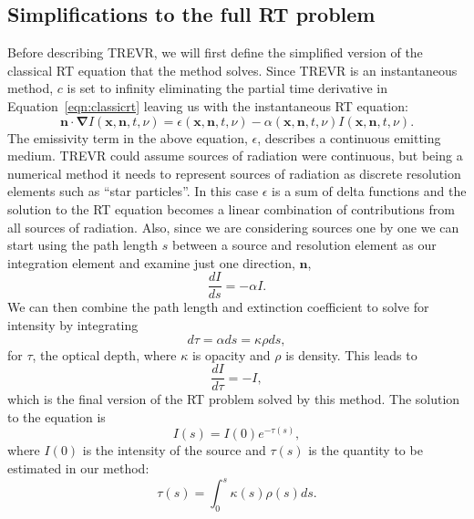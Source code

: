 \documentclass[fleq,usenatbib]{mnras}
\newcommand{\acro}{TREVR}
\begin{document}
{\subsection{Simplifications to the full RT problem}\label{sec:rteq}
Before describing \acro{}, we will first define the simplified version of the 
classical RT equation that the method solves. Since \acro{} is an instantaneous 
method, $c$ is set to infinity eliminating the partial time derivative in 
Equation~\ref{eqn:classicrt} leaving us with the instantaneous RT equation:
\begin{equation} \label{infcrt}
\mathbf{n \cdot \nabla} I\left(\mathbf{x}, \mathbf{n}, t, 
\nu\right) = \epsilon\left(\mathbf{x}, \mathbf{n}, t, \nu\right) - 
\alpha\left(\mathbf{x}, \mathbf{n}, t, \nu\right) 
I\left(\mathbf{x}, \mathbf{n}, t, \nu\right).
\end{equation}
The emissivity term in the above equation, $\epsilon$, describes a continuous 
emitting medium. \acro{} could assume sources of radiation were continuous, but 
being a numerical method it needs to represent sources of radiation as 
discrete resolution elements such as ``star particles''. In this case $\epsilon$ is a sum of delta 
functions and the solution to the RT equation becomes a linear combination of 
contributions from all sources of radiation. Also, since we are considering 
sources one by one we can start using the path length $s$ between a source and 
resolution element as our integration element and examine just one direction, $\mathbf{n}$,
\begin{equation}
\label{eqn:combtransfer}
\frac{dI}{ds} = -\alpha I.
\end{equation}
We can then combine the path length and extinction coefficient to solve for 
intensity by integrating 
\begin{equation}
\label{eqn:dtau}
d\tau = \alpha ds = \kappa \rho ds, 
\end{equation}
for $\tau$, the optical depth, where $\kappa$ is opacity and $\rho$ is 
density. This leads to
\begin{equation}
\label{eqn:absorbtransfer}
\frac{dI}{d\tau} = -I,
\end{equation}
which is the final version of the RT problem solved by this method. The 
solution to the equation is 
\begin{equation}
\label{eqn:ient}
I(s) = I(0)e^{-\tau(s)},
\end{equation}
where $I(0)$ is the intensity of the source and $\tau(s)$ is the
quantity to be estimated in our method:
\begin{equation}
\label{eqn:tauint}
\tau(s) = \int_{0}^s \kappa(s) \rho(s) ds.
\end{equation}

}
\end{document}
